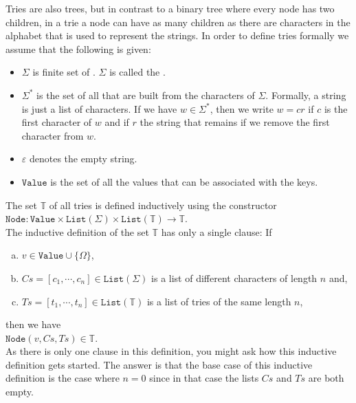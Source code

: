 Tries are also trees, but in contrast to a binary tree where every node has two children, in a trie a
node can have as many children as there are characters in the alphabet that is used to represent the
strings.  In order to define tries formally we assume that the following is given:
\begin{itemize}
\item $\Sigma$ is finite set of . $\Sigma$ is called the
      . 
\item $\Sigma^*$ is the set of all  that are built from the characters of $\Sigma$.
      Formally, a string is just a list of characters.  If we have $w \in \Sigma^*$, then we write $w = cr$
      if $c$ is the first character of $w$ and if $r$ the string that remains if we remove the first
      character from $w$.
\item $\varepsilon$ denotes the empty string.
\item $\texttt{Value}$ is the set of all the values that can be associated with the keys.  
\end{itemize}
The set $\mathbb{T}$ of all tries  is defined inductively using the constructor \\[0.2cm]
\hspace*{1.3cm} 
$\texttt{Node}: \texttt{Value} \times \texttt{List}(\Sigma) \times
\texttt{List}(\mathbb{T}) \rightarrow \mathbb{T}$. 
\\[0.2cm]
The inductive definition of the set $\mathbb{T}$  has only a single clause: If
\begin{enumerate}[(a)]
\item $v \in \texttt{Value} \cup \{\Omega\}$,
\item $C\!s = [c_1, \cdots, c_n] \in \texttt{List}(\Sigma)$ is a list of different characters of length
      $n$ and,
\item $T\!s = [t_1, \cdots, t_n] \in \texttt{List}(\mathbb{T})$ is a list of  tries of the same length $n$, 
\end{enumerate}
then we have 
\\[0.2cm]
\hspace*{1.3cm}  $\texttt{Node}(v, C\!s, T\!s) \in \mathbb{T}$.  
\\[0.2cm]
As there is only one clause in this definition, you might ask how this inductive definition gets started.
The answer is that the base case of this inductive definition is the case where
$n=0$ since in that case the lists  $C\!s$ and $T\!s$ are both empty.

